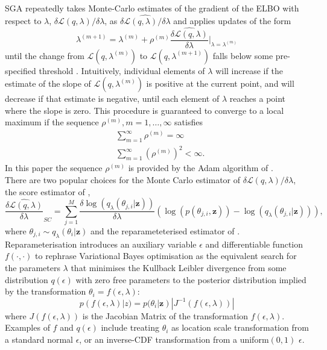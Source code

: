 \documentclass[12pt,a4paper]{article}\usepackage[]{graphicx}\usepackage[]{color}
\begin{document}
SGA repeatedly takes Monte-Carlo estimates of the gradient of the ELBO with respect to $\lambda$, $\delta\mathcal{L}(q, \lambda) / \delta \lambda$, as $\widehat{\delta\mathcal{L}(q, \lambda) / \delta \lambda}$ and applies updates of the form
\begin{equation}
\label{gradientAscent}
\lambda^{(m+1)} = \lambda^{(m)} + \rho^{(m)} \widehat{\frac{\delta\mathcal{L}(q, \lambda)}{\delta \lambda}} \bigg\rvert_{\lambda = \lambda^{(m)}}
\end{equation}
until the change from $\mathcal{L}(q, \lambda^{(m)})$ to $\mathcal{L}(q, \lambda^{(m+1)})$ falls below some pre-specified threshold \citep{Hoffman2013}. Intuitively, individual elements of $\lambda$ will increase if the estimate of the slope of $\mathcal{L}(q, \lambda^{(m)})$ is positive at the current point, and will decrease if that estimate is negative, until each element of $\lambda$ reaches a point where the slope is zero. This procedure is guaranteed to converge to a local maximum \citep{Robbins1951} if the sequence $\rho^{(m)}, m = 1, \dots, \infty$ satisfies
\begin{align}
&\sum_{m=1}^{\infty} \rho^{(m)} =  \infty \\
&\sum_{m=1}^{\infty} (\rho^{(m)})^2 <  \infty.
\end{align}
In this paper the sequence $\rho^{(m)}$ is provided by the Adam algorithm of \citet{Kingma2015b}.
\\

There are two popular choices for the Monte Carlo estimator of $\delta\mathcal{L}(q, \lambda) / \delta \lambda$, the score estimator of \citet{Ranganath2014}, 
\begin{equation}
\label{scoreDeriv}
\widehat{\frac{\delta\mathcal{L}(q, \lambda)}{\delta \lambda}}_{SC} = \sum_{j = 1}^M \frac{\delta \log(q_{\lambda}(\theta_{j, i} | \textbf{z}))}{\delta \lambda} \left(\log(p(\theta_{j, i}, \textbf{z})) - \log(q_{\lambda}(\theta_{j, i} | \textbf{z})) \right),
\end{equation}
where $\theta_{j, i} \sim q_{\lambda}(\theta_i | \textbf{z})$ and the reparameteterised estimator of \citet{Kingma2014}. Reparameterisation introduces an auxiliary variable $\epsilon$ and differentiable function $f(\cdot, \cdot)$ to rephrase Variational Bayes optimisation as the equivalent search for the parameters $\lambda$ that minimises the Kullback Leibler divergence from some distribution $q(\epsilon)$ with zero free parameters to the posterior distribution implied by the transformation $\theta_i = f(\epsilon, \lambda)$:
\begin{equation}
\label{rpDist}
p(f(\epsilon, \lambda) | z) = p(\theta_i | \textbf{z}) |J^{-1}(f(\epsilon, \lambda))|
\end{equation}
where $J(f(\epsilon, \lambda))$ is the Jacobian Matrix of the transformation $f(\epsilon, \lambda)$. Examples of $f$ and $q(\epsilon)$ include treating $\theta_i$ as location scale transformation from a standard normal $\epsilon$, or an inverse-CDF transformation from a uniform$(0, 1)$ $\epsilon$. 
\\
\end{document}
